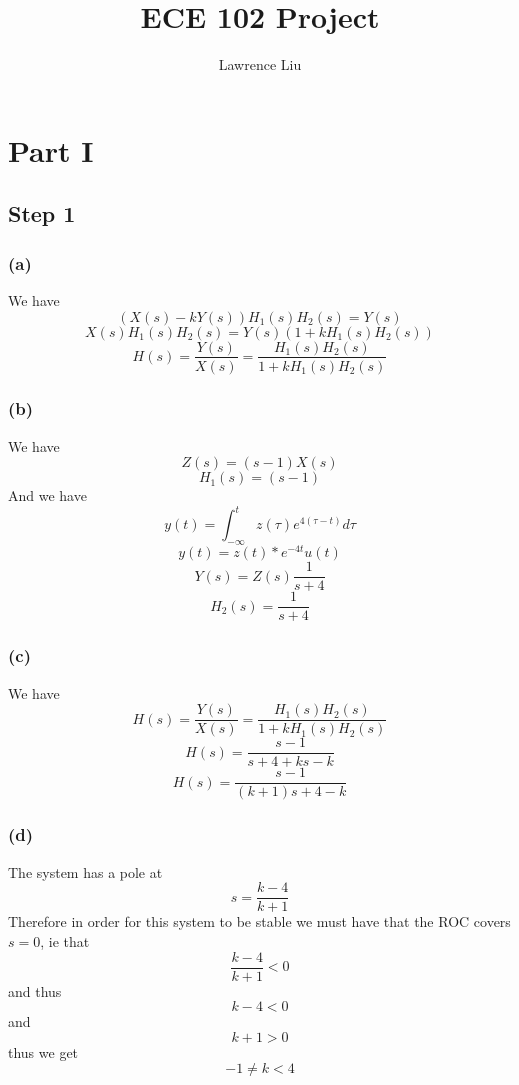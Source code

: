 \documentclass[12pt]{article}
\title{ECE 102 Project}
\author{Lawrence Liu}
\begin{document}
\maketitle
\section{Part I}
\subsection*{Step 1}
\subsubsection*{(a)}
We have $$\left(X(s)-kY(s)\right)H_1(s) H_2(s)=Y(s)$$
$$X(s)H_1(s) H_2(s)=Y(s)\left(1+k H_1(s) H_2(s)\right)$$
$$H(s)=\frac{Y(s)}{X(s)}=\boxed{\frac{H_1(s) H_2(s)}{1+k H_1(s) H_2(s)}}$$
\subsubsection*{(b)}
We have
$$Z(s)=(s-1)X(s)$$
$$H_1(s)=\boxed{(s-1)}$$
And we have
$$y(t)=\int_{-\infty}^{t} z(\tau)e^{4(\tau -t)}d\tau$$
$$y(t)=z(t)*e^{-4t}u(t)$$
$$Y(s)=Z(s)\frac{1}{s+4}$$
$$H_2(s)=\boxed{\frac{1}{s+4}}$$
\subsubsection*{(c)}
We have
$$H(s)=\frac{Y(s)}{X(s)}=\frac{H_1(s) H_2(s)}{1+k H_1(s) H_2(s)}$$
$$H(s)=\frac{s-1}{s+4+ks-k}$$
$$H(s)=\boxed{\frac{s-1}{(k+1)s+4-k}}$$
\subsubsection*{(d)}
The system has a pole at $$s=\frac{k-4}{k+1}$$
Therefore in order for this system to be stable we must have that the ROC covers $s=0$, ie that 
$$\frac{k-4}{k+1}<0$$
and thus
$$k-4<0$$
and 
$$k+1>0$$
thus we get
$$\boxed{-1\neq k<4}$$
\end{document}
